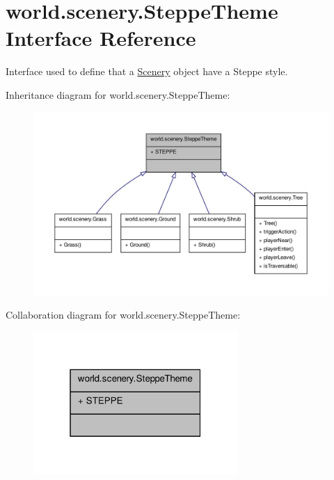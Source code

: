 \hypertarget{interfaceworld_1_1scenery_1_1_steppe_theme}{\section{world.\-scenery.\-Steppe\-Theme Interface Reference}
\label{interfaceworld_1_1scenery_1_1_steppe_theme}
}


Interface used to define that a \hyperlink{classworld_1_1scenery_1_1_scenery}{Scenery} object have a Steppe style.  




Inheritance diagram for world.\-scenery.\-Steppe\-Theme\-:
\nopagebreak
\begin{figure}[H]
\begin{center}
\leavevmode
\includegraphics[width=350pt]{interfaceworld_1_1scenery_1_1_steppe_theme__inherit__graph}
\end{center}
\end{figure}


Collaboration diagram for world.\-scenery.\-Steppe\-Theme\-:
\nopagebreak
\begin{figure}[H]
\begin{center}
\leavevmode
\includegraphics[width=220pt]{interfaceworld_1_1scenery_1_1_steppe_theme__coll__graph}
\end{center}
\end{figure}
